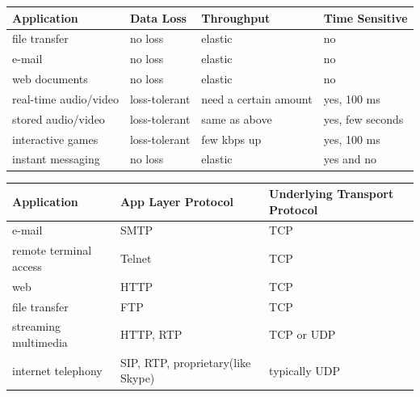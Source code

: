 \documentclass[twoside]{article}
\begin{document}
\begin{center}
    \begin{tabular}{| l | l | l | l |}
        \hline \textbf{Application} & \textbf{Data Loss} & \textbf{Throughput} & \textbf{Time Sensitive} \\ \hline
        \hline file transfer & no loss & elastic & no \\ \hline
        \hline e-mail & no loss & elastic & no \\ \hline
        \hline web documents & no loss & elastic & no \\ \hline
        \hline real-time audio/video & loss-tolerant & need a certain amount & yes, 100 ms \\ \hline
        \hline stored audio/video & loss-tolerant & same as above & yes, few seconds \\ \hline
        \hline interactive games & loss-tolerant & few kbps up & yes, 100 ms \\ \hline
        \hline instant messaging & no loss & elastic & yes and no \\ \hline
    \end{tabular}
\end{center}

\begin{center}
    \begin{tabular}{| l | l | l |}
        \hline \textbf{Application} & \textbf{App Layer Protocol} & \textbf{Underlying Transport Protocol} \\ \hline
        \hline e-mail & SMTP & TCP \\ \hline
        \hline remote terminal access & Telnet & TCP \\ \hline
        \hline web & HTTP & TCP \\ \hline
        \hline file transfer & FTP & TCP \\ \hline
        \hline streaming multimedia & HTTP, RTP & TCP or UDP \\ \hline
        \hline internet telephony & SIP, RTP, proprietary(like Skype) & typically UDP \\ \hline
    \end{tabular}
\end{center}
\end{document}
